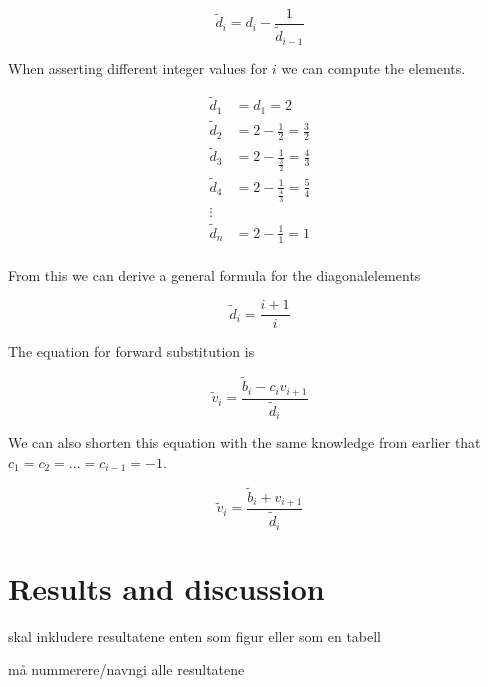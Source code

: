 \documentclass{article}
\begin{document}
    \begin{equation*}
      \tilde{d}_i = d_i - \frac{1}{\tilde{d}_{i-1}}
    \end{equation*}

    When asserting different integer values for $i$ we can compute the elements.

    \begin{align*}
      \tilde{d}_1 &= d_1 = 2 \\
      \tilde{d}_2 &= 2 - \frac{1}{2} = \frac{3}{2} \\
      \tilde{d}_3 &= 2 - \frac{1}{\frac{3}{2}} = \frac{4}{3} \\
      \tilde{d}_4 &= 2 - \frac{1}{\frac{4}{3}} = \frac{5}{4} \\
      \vdots \\
      \tilde{d}_n &= 2 - \frac{1}{1} = 1 \\
    \end{align*}

    From this we can derive a general formula for the diagonalelements

    \begin{equation*}
      \tilde{d}_i = \frac{i+1}{i}
    \end{equation*}

    The equation for forward substitution is

    \begin{equation*}
      \tilde{v}_i = \frac{\tilde{b}_i - c_i v_{i+1}}{\tilde{d}_i}
    \end{equation*}

    We can also shorten this equation with the same knowledge from earlier that $c_1 = c_2 = ... = c_{i-1} = -1$.

    \begin{equation*}
      \tilde{v}_i = \frac{\tilde{b}_i + v_{i+1}}{\tilde{d}_i}
    \end{equation*}






\vspace{1cm}

\section{Results and discussion}

  skal inkludere resultatene enten som figur eller som en tabell

  må nummerere/navngi alle resultatene
\end{document}
